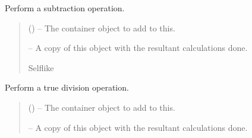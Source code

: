 \documentclass[letterpaper,11pt,english]{sphinxmanual}
\begin{document}
\begin{savenotes}
\begin{fulllineitems}
\begin{savenotes}\begin{fulllineitems}
\label{\detokenize{code/lezargus.container.parent:lezargus.container.parent.LezargusContainerArithmetic.__sub__}}
\pysigstartsignatures
{}
\pysigstopsignatures
\sphinxAtStartPar
Perform a subtraction operation.
\begin{quote}\begin{description}
\sphinxAtStartPar
{} () – The container object to add to this.

\sphinxAtStartPar
{} – A copy of this object with the resultant calculations done.

\sphinxAtStartPar
Self\sphinxhyphen{}like

\end{description}\end{quote}

\end{fulllineitems}\end{savenotes}


\begin{savenotes}\begin{fulllineitems}
\label{\detokenize{code/lezargus.container.parent:lezargus.container.parent.LezargusContainerArithmetic.__truediv__}}
\pysigstartsignatures
{}
\pysigstopsignatures
\sphinxAtStartPar
Perform a true division operation.
\begin{quote}\begin{description}
\sphinxAtStartPar
{} () – The container object to add to this.

\sphinxAtStartPar
{} – A copy of this object with the resultant calculations done.


\end{description}
\end{quote}
\end{fulllineitems}
\end{savenotes}
\end{fulllineitems}
\end{savenotes}
\end{document}
